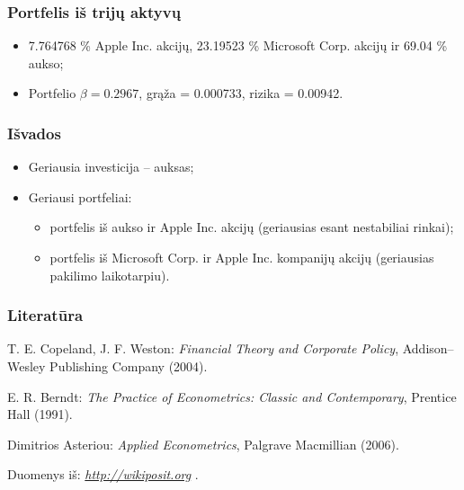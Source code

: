 \documentclass[utf8,hyperref={unicode},xcolor=dvipsnames]{beamer}
\theoremstyle{change}\newtheorem{teorema}{Teiginys}
\theoremstyle{change}\newtheorem{salyga}{}
\newcommand{\HH}{\mathrm{H}} %
\newcommand{\Hao}{\HH_{\alpha}^o}
\begin{document}
\begin{frame}
    \frametitle{Portfelis iš trijų aktyvų}
    \begin{itemize}
	\item 7.764768 \% Apple Inc. akcijų, 23.19523 \% Microsoft Corp. akcijų ir
69.04 \% aukso;
	\item Portfelio $\beta= 0.2967$, grąža = 0.000733, rizika = 0.00942.
    \end{itemize}
\end{frame}

\begin{frame}
    \frametitle{Išvados} 

    \begin{itemize}
\item Geriausia investicija  -- auksas;

\item Geriausi portfeliai: 
\begin{itemize}
	\item portfelis iš aukso ir Apple Inc. akcijų (geriausias esant nestabiliai rinkai);
	\item portfelis iš Microsoft Corp. ir Apple Inc. kompanijų akcijų (geriausias pakilimo laikotarpiu).
\end{itemize}
    \end{itemize}

\end{frame}


\begin{frame}
    \frametitle{Literatūra} 
     \begin{thebibliography}{99}
\label{mySection}
 T. E. Copeland, J. F. Weston:
\emph{Financial Theory and Corporate Policy},
Addison--Wesley Publishing Company (2004).

 E. R. Berndt:
\emph{The Practice of Econometrics: Classic and Contemporary},
Prentice Hall (1991).

 Dimitrios Asteriou:
\emph{Applied Econometrics},
Palgrave Macmillian (2006).

 Duomenys iš:
\emph{ \url{http://wikiposit.org} }.



\end{thebibliography}

 \end{frame}
 
\end{document}
